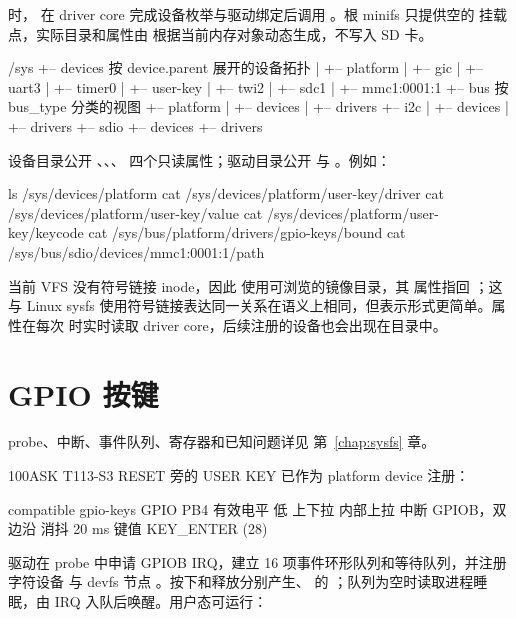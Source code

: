  时， 在 driver core 完成设备枚举与驱动绑定后调用 。根 minifs 只提供空的  挂载点，实际目录和属性由  根据当前内存对象动态生成，不写入 SD 卡。

\begin{txtcode}
/sys
+-- devices                         按 device.parent 展开的设备拓扑
|   +-- platform
|       +-- gic
|       +-- uart3
|       +-- timer0
|       +-- user-key
|       +-- twi2
|       +-- sdc1
|           +-- mmc1:0001:1
+-- bus                             按 bus_type 分类的视图
    +-- platform
    |   +-- devices
    |   +-- drivers
    +-- i2c
    |   +-- devices
    |   +-- drivers
    +-- sdio
        +-- devices
        +-- drivers
\end{txtcode}

设备目录公开 、、、 四个只读属性；驱动目录公开 与 。例如：

\begin{shcode}
ls /sys/devices/platform
cat /sys/devices/platform/user-key/driver
cat /sys/devices/platform/user-key/value
cat /sys/devices/platform/user-key/keycode
cat /sys/bus/platform/drivers/gpio-keys/bound
cat /sys/bus/sdio/devices/mmc1:0001:1/path
\end{shcode}

当前 VFS 没有符号链接 inode，因此  使用可浏览的镜像目录，其  属性指回 ；这与 Linux sysfs 使用符号链接表达同一关系在语义上相同，但表示形式更简单。属性在每次  时实时读取 driver core，后续注册的设备也会出现在目录中。

\section{GPIO 按键}

probe、中断、事件队列、寄存器和已知问题详见 第~\ref{chap:sysfs} 章。

100ASK T113-S3 RESET 旁的 USER KEY 已作为 platform device  注册：

\begin{txtcode}
compatible  gpio-keys
GPIO        PB4
有效电平    低
上下拉      内部上拉
中断        GPIOB，双边沿
消抖        20 ms
键值        KEY_ENTER (28)
\end{txtcode}

 驱动在 probe 中申请 GPIOB IRQ，建立 16 项事件环形队列和等待队列，并注册字符设备  与 devfs 节点 。按下和释放分别产生、 的 ；队列为空时读取进程睡眠，由 IRQ 入队后唤醒。用户态可运行：

